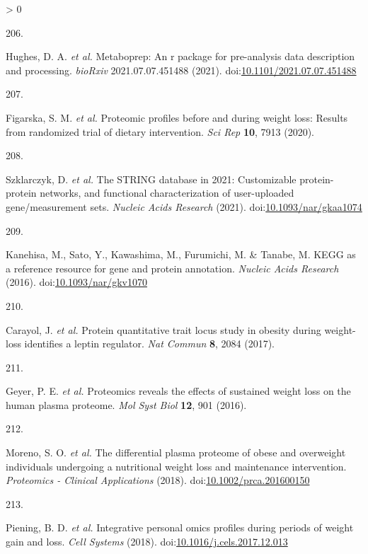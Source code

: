 \documentclass[11pt,twoside]{bristolthesis}
\newlength{\cslhangindent}
\newlength{\csllabelwidth}
\newenvironment{CSLReferences}[2] %
 {%
  \setlength{\parindent}{0pt}
  \ifodd #1 \everypar{\setlength{\hangindent}{\cslhangindent}}\ignorespaces\fi
  \ifnum #2 > 0
  \setlength{\parskip}{#2\baselineskip}
  \fi
 }%
 {}
\newcommand{\CSLLeftMargin}[1]{\parbox[t]{\csllabelwidth}{#1}}
\newcommand{\CSLRightInline}[1]{\parbox[t]{\linewidth - \csllabelwidth}{#1}\break}
\begin{document}
\begin{CSLReferences}{0}{0}
\leavevmode\hypertarget{ref-Hughes2021}{}%
\CSLLeftMargin{206. }
\CSLRightInline{Hughes, D. A. \emph{et al.} Metaboprep: An r package for pre-analysis data description and processing. \emph{bioRxiv} 2021.07.07.451488 (2021). doi:\href{https://doi.org/10.1101/2021.07.07.451488}{10.1101/2021.07.07.451488}}

\leavevmode\hypertarget{ref-Figarska2020}{}%
\CSLLeftMargin{207. }
\CSLRightInline{Figarska, S. M. \emph{et al.} Proteomic profiles before and during weight loss: Results from randomized trial of dietary intervention. \emph{Sci Rep} \textbf{10}, 7913 (2020).}

\leavevmode\hypertarget{ref-Szklarczyk2021}{}%
\CSLLeftMargin{208. }
\CSLRightInline{Szklarczyk, D. \emph{et al.} The STRING database in 2021: Customizable protein-protein networks, and functional characterization of user-uploaded gene/measurement sets. \emph{Nucleic Acids Research} (2021). doi:\href{https://doi.org/10.1093/nar/gkaa1074}{10.1093/nar/gkaa1074}}

\leavevmode\hypertarget{ref-Kanehisa2016}{}%
\CSLLeftMargin{209. }
\CSLRightInline{Kanehisa, M., Sato, Y., Kawashima, M., Furumichi, M. \& Tanabe, M. KEGG as a reference resource for gene and protein annotation. \emph{Nucleic Acids Research} (2016). doi:\href{https://doi.org/10.1093/nar/gkv1070}{10.1093/nar/gkv1070}}

\leavevmode\hypertarget{ref-Carayol2017}{}%
\CSLLeftMargin{210. }
\CSLRightInline{Carayol, J. \emph{et al.} Protein quantitative trait locus study in obesity during weight-loss identifies a leptin regulator. \emph{Nat Commun} \textbf{8}, 2084 (2017).}

\leavevmode\hypertarget{ref-Geyer2016}{}%
\CSLLeftMargin{211. }
\CSLRightInline{Geyer, P. E. \emph{et al.} Proteomics reveals the effects of sustained weight loss on the human plasma proteome. \emph{Mol Syst Biol} \textbf{12}, 901 (2016).}

\leavevmode\hypertarget{ref-OllerMoreno2018}{}%
\CSLLeftMargin{212. }
\CSLRightInline{Moreno, S. O. \emph{et al.} The differential plasma proteome of obese and overweight individuals undergoing a nutritional weight loss and maintenance intervention. \emph{Proteomics - Clinical Applications} (2018). doi:\href{https://doi.org/10.1002/prca.201600150}{10.1002/prca.201600150}}

\leavevmode\hypertarget{ref-Piening2018}{}%
\CSLLeftMargin{213. }
\CSLRightInline{Piening, B. D. \emph{et al.} Integrative personal omics profiles during periods of weight gain and loss. \emph{Cell Systems} (2018). doi:\href{https://doi.org/10.1016/j.cels.2017.12.013}{10.1016/j.cels.2017.12.013}}


\end{CSLReferences}
\end{document}
